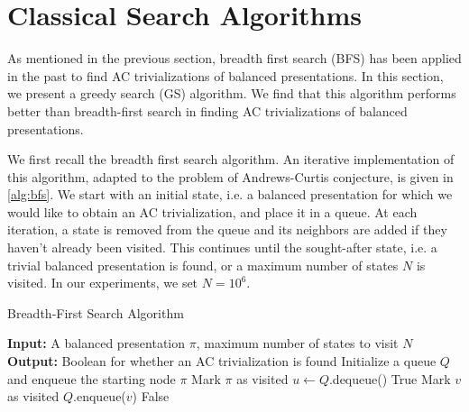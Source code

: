 
\section{Classical Search Algorithms} \label{sec:search}
As mentioned in the previous section, breadth first search (BFS) has been applied in the past to find AC trivializations of balanced presentations. In this section, we present a greedy search (GS) algorithm. We find that this algorithm performs better than breadth-first search in finding AC trivializations of balanced presentations.
\newline 

We first recall the breadth first search algorithm. An iterative implementation of this algorithm, adapted to the problem of Andrews-Curtis conjecture, is given in \autoref{alg:bfs}. We start with an initial state, i.e. a balanced presentation for which we would like to obtain an AC trivialization, and place it in a queue. At each iteration, a state is removed from the queue and its neighbors are added if they haven't already been visited. This continues until the sought-after state, i.e. a trivial balanced presentation is found, or a maximum number of states $N$ is visited. In our experiments, we set $N=10^6$. 
\newline 

\begin{algorithm}
\caption{Breadth-First Search Algorithm}\label{alg:bfs}
\begin{algorithmic}[1] %
\State \textbf{Input:} A balanced presentation $\pi$, maximum number of states to visit $N$
\State \textbf{Output:} Boolean for whether an AC trivialization is found
\State Initialize a queue $Q$ and enqueue the starting node $\pi$
\State Mark $\pi$ as visited
    \State $u \gets Q$.dequeue() 
            \State \Return True 
        \EndIf
            \State Mark $v$ as visited
            \State $Q$.enqueue($v$) 
        \EndIf
    \EndFor
\EndWhile
\State \Return False 
\end{algorithmic}
\end{algorithm}

